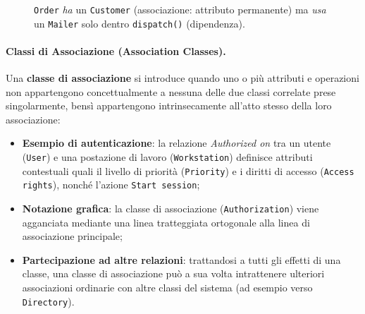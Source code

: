 \documentclass[12pt]{extarticle}
\newcommand{\cn}[1]{\makebox[\linewidth][c]{\textbf{#1}}}
\begin{document}
\begin{figure}[htbp]
    \centering
{}
    \caption{\texttt{Order} \emph{ha} un \texttt{Customer} (associazione: attributo permanente) ma \emph{usa} un \texttt{Mailer} solo dentro \texttt{dispatch()} (dipendenza).}
    \label{fig:uml-assoc-vs-dep}
\end{figure}

\paragraph{Classi di Associazione (Association Classes).}
Una \textbf{classe di associazione} si introduce quando uno o più attributi e operazioni non appartengono concettualmente a nessuna delle due classi correlate prese singolarmente, bensì appartengono intrinsecamente all'atto stesso della loro associazione:
\begin{itemize}
    \item \textbf{Esempio di autenticazione}: la relazione \textit{Authorized on} tra un utente (\texttt{User}) e una postazione di lavoro (\texttt{Workstation}) definisce attributi contestuali quali il livello di priorità (\texttt{Priority}) e i diritti di accesso (\texttt{Access rights}), nonché l'azione \texttt{Start session};
    \item \textbf{Notazione grafica}: la classe di associazione (\texttt{Authorization}) viene agganciata mediante una linea tratteggiata ortogonale alla linea di associazione principale;
    \item \textbf{Partecipazione ad altre relazioni}: trattandosi a tutti gli effetti di una classe, una classe di associazione può a sua volta intrattenere ulteriori associazioni ordinarie con altre classi del sistema (ad esempio verso \texttt{Directory}).
\end{itemize}
\end{document}

